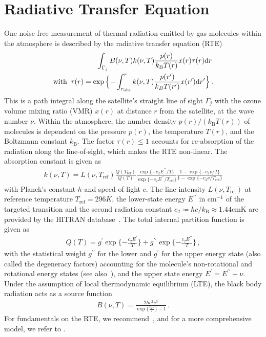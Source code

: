 \section{Radiative Transfer Equation}
\label{sec:RTE}
One noise-free measurement of thermal radiation emitted by gas molecules within the atmosphere is described by the radiative transfer equation (RTE)~\cite{mipas2000handbook}
\begin{align}
	\label{eq:RTE} 
	  \int_{\Gamma_j}  B(\nu,T) k(\nu, T)   \frac{p(r)}{k_{\text{B}} T(r)}  x(r)  \tau(r) \text{d}r \,  \\
\text{with } \,	\tau(r) = \exp{ \Bigl\{ - \int^{r}_{r_\text{obs}}  k(\nu, T)   \frac{p(r^{\prime})}{k_B T(r^{\prime})}  x(r^{\prime}) \text{d}r^{\prime} \Bigr\} } \, \label{eq:absRTE} .
\end{align}
This is a path integral along the satellite's straight line of sight $\Gamma_j$ with the ozone volume mixing ratio (VMR) $x(r)$ at distance $r$ from the satellite, at the wave number $\nu$.
Within the atmosphere, the number density $p(r) / (k_{\text{B}} T(r))$ of molecules is dependent on the pressure $p(r)$, the temperature $T(r)$, and the Boltzmann constant $k_{\text{B}}$.
The factor $\tau(r)\leq 1$ accounts for re-absorption of the radiation along the line-of-sight, which makes the RTE non-linear.
The absorption constant is given as
\begin{align}
	k(\nu, T) = L(\nu, T_{\text{ref}}) \frac{Q(T_{\text{ref}})}{Q(T)} \frac{ \exp{\{ - c_2 E^{\prime \prime} / T\}} }{\exp{\{ - c_2 E^{\prime \prime} / T_{\text{ref}} \}}} \frac{ 1- \exp{\{ - c_2 \nu  / T \}} }{1 - \exp{\{ - c_2 \nu / T_{\text{ref}} \}}}
\end{align}
with Planck's constant $h$ and speed of light $c$.
The line intensity $L(\nu, T_{\text{ref}})$ at reference temperature $T_{\text{ref}} =296K $, the lower-state energy $ E^{\prime \prime} $ in $\text{cm}^{-1}$ of the targeted transition and the second radiation constant $c_2\coloneqq hc/k_{\text{B}} \approx 1.44\text{cmK}$ are provided by the HITRAN database~\cite{gordon2022hitran2020}.
The total internal partition function is given as
\begin{align}
	Q(T )= g^{ \prime} \exp{\{ - \frac{ c_2 E^{ \prime} }{T}\}} + g^{\prime \prime} \exp{\{ - \frac{ c_2 E^{\prime \prime} }{T}\}} \, ,
\end{align}
with the statistical weight $ g^{\prime \prime}$ for the lower and $ g^{ \prime}$ for the upper energy state (also called the degeneracy factors) accounting for the molecule's non-rotational and rotational energy states (see also~\cite{vsimevckova2006einstein}), and the upper state energy $E^{ \prime} = E^{ \prime\prime} + \nu$.
Under the assumption of local thermodynamic equilibrium (LTE), the black body radiation acts as a source function
\begin{align}
	B(\nu,T)   = \frac{2 h c^2 \nu^3}{\exp{\{\frac{c_2\nu}{ T}\}}-1}\, .
\end{align}
For fundamentals on the RTE, we recommend~\cite[Chapter 1]{rybicki2000rte}, and for a more comprehensive model, we refer to \cite{read2006forwardModel}.

